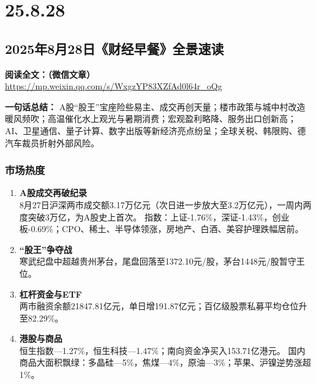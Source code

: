 \chapter{25.8.28}



\section{2025年8月28日《财经早餐》全景速读}
\vspace{1cm}
\noindent\textbf{阅读全文：（微信文章）} \url{https://mp.weixin.qq.com/s/WxgzYP83XZfAd0l64r_oQg}

\textbf{一句话总结：}  
A股“股王”宝座险些易主、成交再创天量；楼市政策与城中村改造暖风频吹；高温催化水上观光与暑期消费；宏观盈利略降、服务出口创新高；AI、卫星通信、量子计算、数字出版等新经济亮点纷呈；全球关税、韩限购、德汽车裁员折射外部风险。

\subsection{市场热度}
\begin{enumerate}[leftmargin=*, nosep]
    \item \textbf{A股成交再破纪录}  \\
    8月27日沪深两市成交额3.17万亿元（次日进一步放大至3.2万亿元），一周内两度突破3万亿，为A股史上首次。  
    指数：上证-1.76\%，深证-1.43\%，创业板-0.69\%；CPO、稀土、半导体领涨，房地产、白酒、美容护理跌幅居前。
    \item \textbf{“股王”争夺战}  \\
    {\color{red}寒武纪}盘中超越贵州茅台，尾盘回落至1372.10元/股，茅台1448元/股暂守王位。
    \item \textbf{杠杆资金与ETF}  \\
    两市融资余额21847.81亿元，单日增191.87亿元；百亿级股票私募平均仓位升至82.29\%。
    \item \textbf{港股与商品}  \\
    恒生指数—1.27\%，恒生科技—1.47\%；南向资金净买入153.71亿港元。  
    国内商品大面积飘绿：多晶硅—5\%，焦煤—4\%，原油—3\%；苹果、沪镍逆势涨超1\%。
\end{enumerate}

